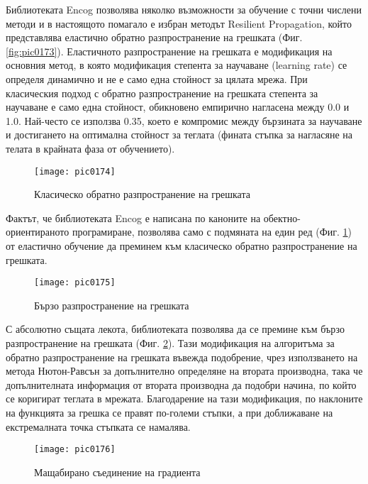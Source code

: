 Библиотеката Encog позволява няколко възможности за обучение с точни числени методи и в настоящото помагало  е избран методът Resilient Propagation, който представлява еластично обратно разпространение на грешката (Фиг. \ref{fig:pic0173}). Еластичното разпространение на грешката е модификация на основния метод, в която модификация степента за научаване (learning rate) се определя динамично и не е само една стойност за цялата мрежа. При класическия подход с обратно разпространение на грешката степента за научаване е само една стойност, обикновено емпирично нагласена между 0.0 и 1.0. Най-често се използва 0.35, което е компромис между бързината за научаване и достигането на оптимална стойност за теглата (фината стъпка за нагласяне на телата в крайната фаза от обучението).

\begin{figure}[h]
  \centering
  \texttt{[image: pic0174]}
  \caption{Класическо обратно разпространение на грешката}
\label{fig:pic0174}
\end{figure}
\FloatBarrier

Фактът, че библиотеката Encog е написана по каноните на обектно-ориентираното програмиране, позволява само с подмяната на един ред (Фиг. \ref{fig:pic0174}) от еластично обучение да преминем към класическо обратно разпространение на грешката. 

\begin{figure}[h]
  \centering
  \texttt{[image: pic0175]}
  \caption{Бързо разпространение на грешката}
\label{fig:pic0175}
\end{figure}
\FloatBarrier

С абсолютно същата лекота, библиотеката позволява да се премине към бързо разпространение на грешката (Фиг. \ref{fig:pic0175}). Тази модификация на алгоритъма за обратно разпространение на грешката въвежда подобрение, чрез използването на метода Нютон-Равсън за допълнително определяне на втората производна, така че допълнителната информация от втората производна да подобри начина, по който се коригират теглата в мрежата. Благодарение на тази модификация, по наклоните на функцията за грешка се правят по-големи стъпки, а при доближаване на екстремалната точка стъпката се намалява. 

\begin{figure}[h]
  \centering
  \texttt{[image: pic0176]}
  \caption{Мащабирано съединение на градиента}
\label{fig:pic0176}
\end{figure}
\FloatBarrier

